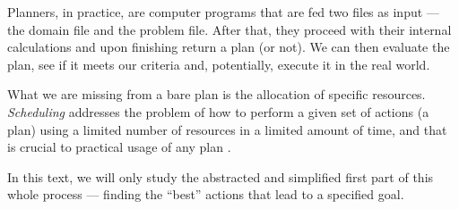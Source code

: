 Planners, in practice, are computer programs that are fed two files as input
--- the domain file and the problem file. After that, they proceed with their internal calculations
and upon finishing return a plan (or not). 
We can then evaluate the plan, see if it meets our criteria and, potentially,
execute it in the real world.

What we are missing from a bare plan is the allocation of specific resources.
\textit{Scheduling} addresses the problem of how to perform a given set of actions (a plan)
using a limited number of resources in a limited amount of time, and
that is crucial to practical usage of any plan \citep[Chapter~15]{Ghallab2004}.

In this text, we will only study the abstracted and simplified first part of this whole process
--- finding the ``best'' actions that lead to a specified goal.


















